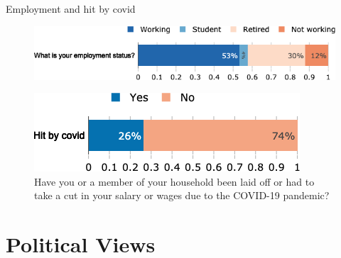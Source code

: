 \documentclass[aspectratio=169,9pt,dvipsnames]{beamer}
\begin{document}
\begin{frame}{Employment and hit by covid}%
\begin{figure}[h!]
\centering
\captionsetup{justification=centering}
\caption{What is your employment status?}
\includegraphics[width=.8\textwidth]{../figures/US/employment_status_US.png} \\
\vspace{.5cm}
\caption{Have you or a member of your household been laid off or had to take a cut in your salary or wages due to the COVID-19 pandemic?}
\includegraphics[width=.55\textwidth]{../figures/US/hit_by_covid_US.png}
\end{figure}
\end{frame}


\section{Political Views}
\end{document}
